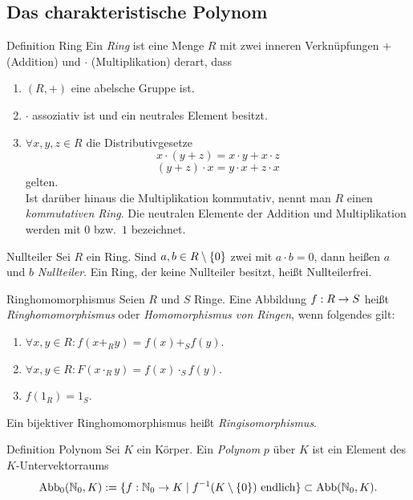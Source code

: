 \documentclass[main.tex]{subfiles}
\begin{document}
\subsection*{Das charakteristische Polynom} %
\begin{karte}{Definition Ring}
    Ein \textit{Ring} ist eine Menge \(R\) mit zwei inneren 
    Verknüpfungen \(+\) (Addition) und \( \cdot \) 
    (Multiplikation) derart, dass 
    \begin{enumerate}
        \item \( (R, +) \) eine abelsche Gruppe ist.
        \item \( \cdot \) assoziativ ist und ein neutrales 
        Element besitzt.
        \item \( \forall x,y,z \in R \) die Distributivgesetze 
        \[ x \cdot (y + z) = x \cdot y + x \cdot z \]
        \[ (y + z) \cdot x = y \cdot x + z \cdot x \]
        gelten.\\ 
        Ist darüber hinaus die Multiplikation kommutativ, nennt man 
        \(R\) einen \textit{kommutativen Ring}. Die neutralen Elemente 
        der Addition und Multiplikation werden mit \(0\) bzw.\ 
        \(1\) bezeichnet.
    \end{enumerate}
\end{karte}
\begin{karte}{Nullteiler}
    Sei \(R\) ein Ring. Sind \(a,b \in R \setminus \{0\} \) 
    zwei mit \( a \cdot b = 0 \), dann heißen \(a\) und \(b\) 
    \textit{Nullteiler}. Ein Ring, der keine Nullteiler besitzt, 
    heißt Nullteilerfrei.
\end{karte}
\begin{karte}{Ringhomomorphismus}
    Seien \(R\) und \(S\) Ringe. Eine Abbildung 
    \( f : R \rightarrow S \) heißt \textit{Ringhomomorphismus} oder 
    \textit{Homomorphismus von Ringen}, wenn folgendes gilt:
    \begin{enumerate}
        \item \( \forall x,y \in R: f(x +_R y) = f(x) +_S f(y) \).
        \item \( \forall x,y \in R: F(x \cdot_R y) 
        = f(x) \cdot_S f(y) \).
        \item \( f(1_R) = 1_S \).
    \end{enumerate}
    Ein bijektiver Ringhomomorphismus heißt 
    \textit{Ringisomorphismus}.
\end{karte}
\begin{karte}{Definition Polynom}
    Sei \(K\) ein Körper. Ein \textit{Polynom} \(p\) über \(K\) 
    ist ein Element des\\
    \(K\)-Untervektorraums
    \[ \Abb_0(\N_0, K) := 
    \set{ \abb{f}{\N_0}{K} \;\vert \; 
    \inverse{f}(K \setminus \set{0}) \text{ endlich} } 
    \subset \Abb(\N_0, K). \]
\end{karte}
\end{document}
